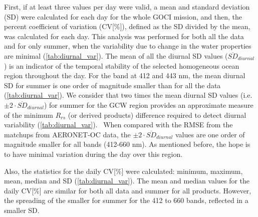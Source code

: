\documentclass[onecolumn,3p,letterpaper,11pt]{elsarticle}
\begin{document}
First, if at least three values per day were valid, a mean and standard deviation (SD) were calculated for each day for the whole GOCI mission, and then, the percent coefficient of variation (CV[\%]), defined as the SD divided by the mean, was calculated for each day.
This analysis was performed for both all the data and for only summer, when the variability due to change in the water properties are minimal (\autoref{tab:diurnal_var}).
The mean of all the diurnal SD values ($\overline{SD}_{diurnal}$) is an indicator of the temporal stability of the selected homogeneous ocean region throughout the day. 
For the band at 412 and 443 nm, the mean diurnal SD for summer is one order of magnitude smaller than for all the data (\autoref{tab:diurnal_var}).
We consider that two times the mean diurnal SD values (i.e. $\pm2\cdot \overline{SD}_{diurnal}$) for summer for the GCW region provides an approximate measure of the minimum $R_{rs}$ (or derived products) difference required to detect diurnal variability (\autoref{tab:diurnal_var}).
~When compared with the RMSE from the matchups from AERONET-OC data, the $\pm2\cdot \overline{SD}_{diurnal}$ values are one order of magnitude smaller for all bands (412-660 nm).
As mentioned before, the hope is to have minimal variation during the day over this region.

Also, the statistics for the daily CV[\%] were calculated: minimum, maximum, mean, median and SD (\autoref{tab:diurnal_var}). The mean and median values for the daily CV[\%] are similar for both all data and summer for all products. However, the spreading of the smaller for summer for the 412 to 660 bands, reflected in a smaller SD.
\end{document}
